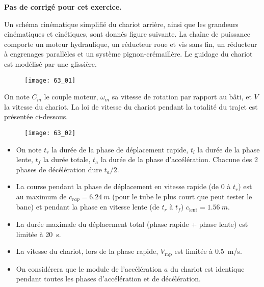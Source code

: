 \normaltrue
\correctionfalse


\setcounter{numques}{0}
\ifcorrection
\else
\textbf{Pas de corrigé pour cet exercice.}
\fi

Un schéma cinématique simplifié du chariot arrière, ainsi que les grandeurs cinématiques et cinétiques,
sont donnés figure suivante.
La chaîne de puissance comporte un moteur hydraulique, un réducteur roue et vis sans fin, un réducteur à
engrenages parallèles et un système pignon-crémaillère.
Le guidage du chariot est modélisé par une glissière.



\begin{figure}[H]
\centering
\texttt{[image: 63\_01]}
\end{figure}


On note $C_m$  le couple moteur, $\omega_m$ sa vitesse de rotation par rapport au bâti, et $V$ la vitesse du chariot.
La loi de vitesse du chariot pendant la totalité du trajet est présentée ci-dessous.

\begin{figure}[H]
\centering
\texttt{[image: 63\_02]}
\end{figure}


\begin{itemize}
\item On note $t_r$ la durée de la phase de déplacement rapide, $t_l$ la durée de la phase lente, $t_f$ la durée
totale, $t_a$ la durée de la phase d'accélération. Chacune des 2 phases de décélération dure $t_a/2$.
\item La course pendant la phase de déplacement en vitesse rapide (de 0 à $t_r$) est au maximum de
$c_{rap}= \SI{6,24}{m}$ (pour le tube le plus court que peut tester le banc) et pendant la phase en vitesse
lente (de $t_r$ à $t_f$) $c_{\text{lent}}= \SI{1,56}{m}$.
\item La durée maximale du déplacement total (phase rapide + phase lente) est limitée à \SI{20}{s}.
\item La vitesse du chariot, lors de la phase rapide, $V_{\text{rap}}$ est limitée à \SI{0,5}{m/s}.
\item On considérera que le module de l'accélération $a$ du chariot est identique pendant toutes les
phases d'accélération et de décélération.
\end{itemize}

